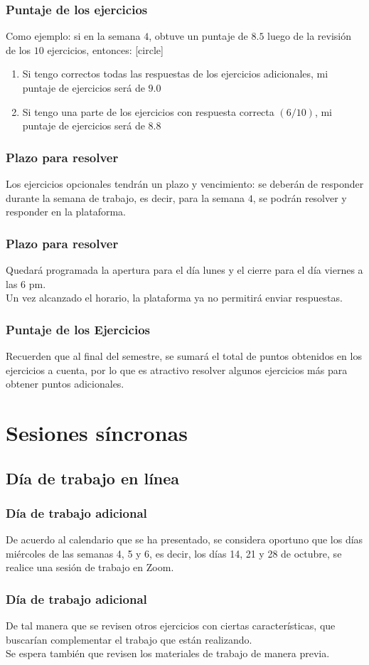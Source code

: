 \begin{frame}
\frametitle{Puntaje de los ejercicios}
Como ejemplo: si en la semana $4$, obtuve un puntaje de $8.5$ luego de la revisión de los $10$ ejercicios, entonces:
[circle]
\begin{enumerate}[<+->]
\item Si tengo correctos todas las respuestas de los ejercicios adicionales, mi puntaje de ejercicios  será de $9.0$
\item Si tengo una parte de los ejercicios con respuesta correcta $(6/10)$, mi puntaje de ejercicios será de $8.8$
\end{enumerate}
\end{frame}
\begin{frame}
\frametitle{Plazo para resolver}
Los ejercicios opcionales tendrán un plazo y vencimiento: se deberán de responder durante la semana de trabajo, es decir, para la semana $4$, se podrán resolver y responder en la plataforma.
\end{frame}
\begin{frame}
\frametitle{Plazo para resolver}
Quedará programada la apertura para el día lunes y el cierre para el día viernes a las 6 pm.
\\
\bigskip
Un vez alcanzado el horario, la plataforma ya no permitirá enviar respuestas.
\end{frame}
\begin{frame}
\frametitle{Puntaje de los Ejercicios}
Recuerden que al final del semestre, se sumará el total de puntos obtenidos en los ejercicios a cuenta, por lo que es atractivo resolver algunos ejercicios más para obtener puntos adicionales.
\end{frame}
\section{Sesiones síncronas}
\subsection{Día de trabajo en línea}
\begin{frame}
\frametitle{Día de trabajo adicional}
De acuerdo al calendario que se ha presentado, se considera oportuno que los días miércoles de las semanas 4, 5 y 6, es decir, los días 14, 21 y 28 de octubre, se realice una sesión de trabajo en Zoom.
\end{frame}
\begin{frame}
\frametitle{Día de trabajo adicional}
De tal manera que se revisen otros ejercicios con ciertas características, que buscarían complementar el trabajo que están realizando.
\\
\bigskip
Se espera también que revisen los materiales de trabajo de manera previa.
\end{frame}
